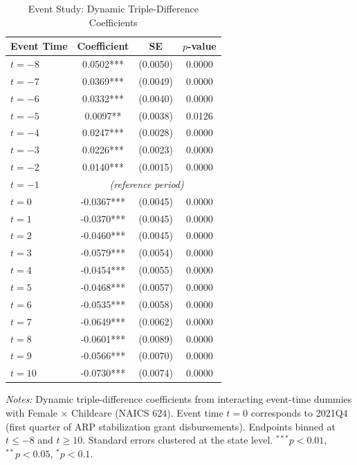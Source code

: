 \begin{table}[htbp]
\centering
\caption{Event Study: Dynamic Triple-Difference Coefficients}
\label{tab:eventstudy}
\begin{tabular}{lccc}
\toprule
Event Time & Coefficient & SE & $p$-value \\
\midrule
$t = -8$ & 0.0502*** & (0.0050) & 0.0000 \\
$t = -7$ & 0.0369*** & (0.0049) & 0.0000 \\
$t = -6$ & 0.0332*** & (0.0040) & 0.0000 \\
$t = -5$ & 0.0097** & (0.0038) & 0.0126 \\
$t = -4$ & 0.0247*** & (0.0028) & 0.0000 \\
$t = -3$ & 0.0226*** & (0.0023) & 0.0000 \\
$t = -2$ & 0.0140*** & (0.0015) & 0.0000 \\
$t = -1$ & \multicolumn{3}{c}{\textit{(reference period)}} \\
$t = 0$ & -0.0367*** & (0.0045) & 0.0000 \\
$t = 1$ & -0.0370*** & (0.0045) & 0.0000 \\
$t = 2$ & -0.0460*** & (0.0045) & 0.0000 \\
$t = 3$ & -0.0579*** & (0.0054) & 0.0000 \\
$t = 4$ & -0.0454*** & (0.0055) & 0.0000 \\
$t = 5$ & -0.0468*** & (0.0057) & 0.0000 \\
$t = 6$ & -0.0535*** & (0.0058) & 0.0000 \\
$t = 7$ & -0.0649*** & (0.0062) & 0.0000 \\
$t = 8$ & -0.0601*** & (0.0089) & 0.0000 \\
$t = 9$ & -0.0566*** & (0.0070) & 0.0000 \\
$t = 10$ & -0.0730*** & (0.0074) & 0.0000 \\
\bottomrule
\end{tabular}
\begin{tablenotes}[flushleft]
\small
\item \textit{Notes:} Dynamic triple-difference coefficients from interacting event-time dummies with Female $\times$ Childcare (NAICS 624). Event time $t = 0$ corresponds to 2021Q4 (first quarter of ARP stabilization grant disbursements). Endpoints binned at $t \leq -8$ and $t \geq 10$. Standard errors clustered at the state level. $^{***}p<0.01$, $^{**}p<0.05$, $^{*}p<0.1$.
\end{tablenotes}
\end{table}
